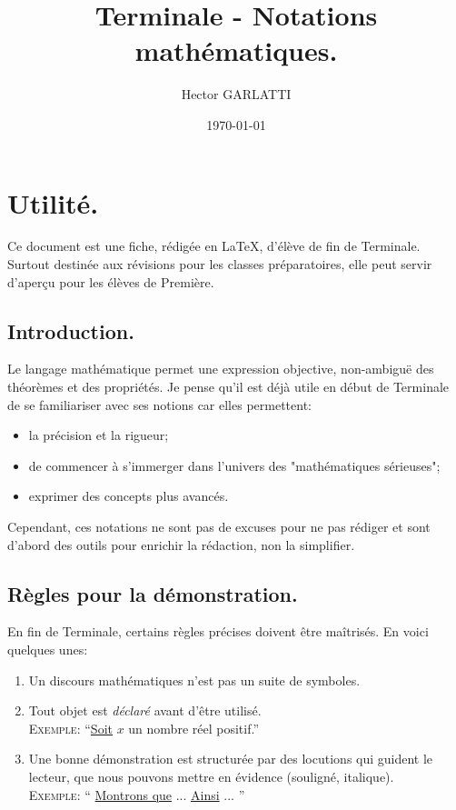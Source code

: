 \documentclass{article}
\title{Terminale - Notations mathématiques.}
\author{Hector GARLATTI}
\date{\today{}}
\newcommand{\Ex}{\textsc{Exemple}: }
\begin{document}
\sloppy 
\maketitle

\section{Utilité.}
Ce document est une fiche, rédigée en \LaTeX, d'élève de fin de Terminale. 
Surtout destinée aux révisions pour les classes préparatoires, 
elle peut servir d'aperçu pour les élèves de Première.

\subsection{Introduction.}
Le langage mathématique permet une expression objective, non-ambiguë
des théorèmes et des propriétés. Je pense qu'il est déjà utile en début
de Terminale de se familiariser avec ses notions car elles permettent:
\begin{itemize}
    \item la précision et la rigueur;
    \item de commencer à s'immerger dans l'univers
    des "mathématiques sérieuses";
    \item exprimer des concepts plus avancés.
\end{itemize}

Cependant, ces notations ne sont pas de excuses pour ne pas rédiger
et sont d'abord des outils pour enrichir la rédaction, non la simplifier.

\subsection{Règles pour la démonstration.}
En fin de Terminale, certains règles précises doivent être maîtrisés. 
En voici quelques unes:
\begin{enumerate}
    \item Un discours mathématiques n'est pas un suite de symboles.
    \item Tout objet est \textit{déclaré} avant d'être utilisé. \\
        \Ex \enquote{\underline{Soit} $x$ un nombre réel positif.}
    \item Une bonne démonstration est structurée par des locutions 
    qui guident le lecteur, que nous pouvons mettre en évidence
    (souligné, italique). \\
        \Ex \enquote{
            \underline{Montrons que} ... 
            \underline{Ainsi} ...
        }
\end{enumerate}
\end{document}
